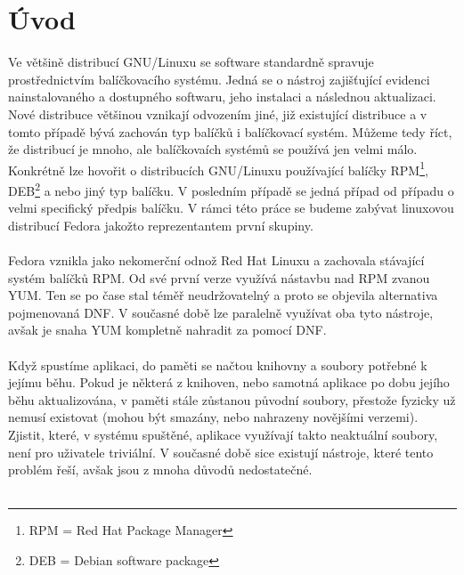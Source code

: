 \documentclass[10pt,a4paper]{article}
\begin{document}
	\section{Úvod}
		Ve většině distribucí GNU/Linuxu se software standardně spravuje prostřednictvím balíčkovacího systému. Jedná se o nástroj zajišťující evidenci nainstalovaného a dostupného softwaru, jeho instalaci a následnou aktualizaci. Nové distribuce většinou vznikají odvozením jiné, již existující distribuce a v tomto případě bývá zachován typ balíčků i balíčkovací systém. Můžeme tedy říct, že distribucí je mnoho, ale balíčkovaích systémů se používá jen velmi málo. Konkrétně lze hovořit o distribucích GNU/Linuxu používající balíčky RPM\footnote{RPM = Red Hat Package Manager}, DEB\footnote{DEB = Debian software package} a nebo jiný typ balíčku. V posledním případě se jedná případ od případu o velmi specifický předpis balíčku. V rámci této práce se budeme zabývat linuxovou distribucí Fedora jakožto reprezentantem první skupiny.
		\\
		\\
		Fedora vznikla jako nekomerční odnož Red Hat Linuxu a zachovala stávající systém balíčků RPM\@. Od své první verze využívá nástavbu nad RPM zvanou YUM\@. Ten se po čase stal téměř neudržovatelný a proto se objevila alternativa pojmenovaná DNF\@. V současné době lze paralelně využívat oba tyto nástroje, avšak je snaha YUM kompletně nahradit za pomocí DNF\@.
		\\
		\\
		Když spustíme aplikaci, do paměti se načtou knihovny a soubory potřebné k jejímu běhu. Pokud je některá z knihoven, nebo samotná aplikace po dobu jejího běhu aktualizována, v paměti stále zůstanou původní soubory, přestože fyzicky už nemusí existovat (mohou být smazány, nebo nahrazeny novějšími verzemi).
		\\
		Zjistit, které, v systému spuštěné, aplikace využívají takto neaktuální soubory, není pro uživatele triviální. V současné době sice existují nástroje, které tento problém řeší, avšak jsou z mnoha důvodů nedostatečné.
		\\
		\\
\end{document}
